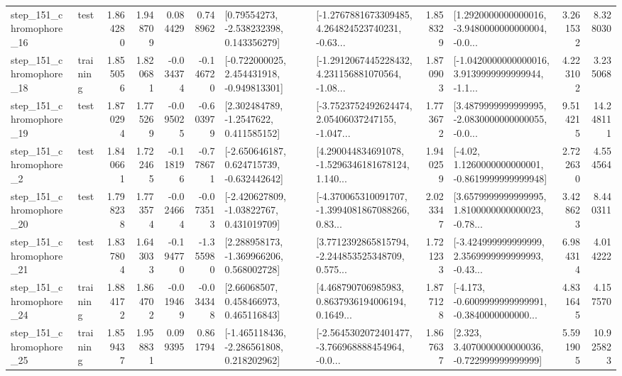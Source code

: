 \begin{tabular}{llrrrrllrlrr}
  step\_151\_chromophore\_16 &      test &      1.864280 &    1.948709 &      0.084429 &  0.748962 &     [0.79554273, -2.538232398, 0.143356279] &  [-1.2767881673309485, 4.264824523740231, -0.63... &       1.858329 &  [1.2920000000000016, -3.9480000000000004, -0.0... &            3.261532 &          8.328030 \\
  step\_151\_chromophore\_18 &  training &      1.855056 &    1.820681 &     -0.034374 & -0.146720 &   [-0.722000025, 2.454431918, -0.949813301] &  [-1.2912067445228432, 4.231156881070564, -1.08... &       1.870903 &  [-1.0420000000000016, 3.9139999999999944, -1.1... &            4.223102 &          3.235068 \\
  step\_151\_chromophore\_19 &      test &      1.870294 &    1.775269 &     -0.095025 & -0.603979 &      [2.302484789, -1.2547622, 0.411585152] &  [-3.7523752492624474, 2.05406037247155, -1.047... &       1.773672 &  [3.4879999999999995, -2.0830000000000055, -0.0... &            9.514215 &         14.248111 \\
   step\_151\_chromophore\_2 &      test &      1.840661 &    1.722465 &     -0.118196 & -0.778671 &   [-2.650646187, 0.624715739, -0.632442642] &  [4.290044834691078, -1.5296346181678124, 1.140... &       1.940259 &   [-4.02, 1.1260000000000001, -0.8619999999999948] &            2.722630 &          4.554564 \\
  step\_151\_chromophore\_20 &      test &      1.798238 &    1.773574 &     -0.024664 & -0.073513 &    [-2.420627809, -1.03822767, 0.431019709] &  [-4.370065310091707, -1.3994081867088266, 0.83... &       2.023347 &  [3.6579999999999995, 1.8100000000000023, -0.78... &            3.428623 &          8.440311 \\
  step\_151\_chromophore\_21 &      test &      1.837804 &    1.643033 &     -0.194770 & -1.355980 &    [2.288958173, -1.369966206, 0.568002728] &  [3.7712392865815794, -2.244853525348709, 0.575... &       1.721233 &  [-3.424999999999999, 2.3569999999999993, -0.43... &            6.984314 &          4.014222 \\
  step\_151\_chromophore\_24 &  training &      1.884172 &    1.864702 &     -0.019469 & -0.034348 &      [2.66068507, 0.458466973, 0.465116843] &  [4.468790706985983, 0.8637936194006194, 0.1649... &       1.877128 &  [-4.173, -0.6009999999999991, -0.3840000000000... &            4.831645 &          4.157570 \\
  step\_151\_chromophore\_25 &  training &      1.859437 &    1.958831 &      0.099395 &  0.861794 &   [-1.465118436, -2.286561808, 0.218202962] &  [-2.5645302072401477, -3.766968888454964, -0.0... &       1.867637 &    [2.323, 3.4070000000000036, -0.722999999999999] &            5.591905 &         10.925823 \\

\end{tabular}
